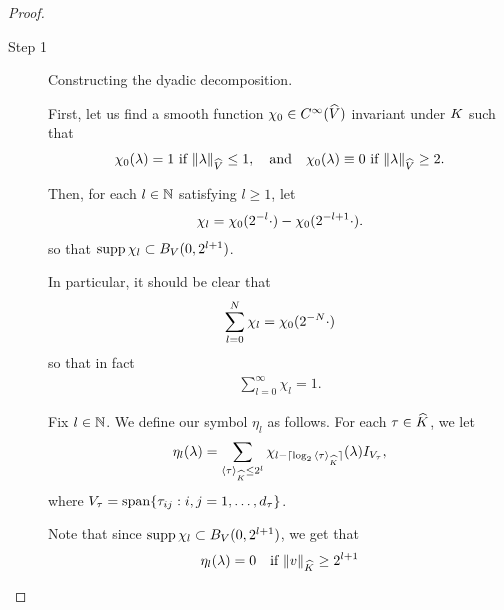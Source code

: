\begin{proof}
    \begin{description}
        \item[Step 1] Constructing the dyadic decomposition.

            First, let us find a smooth function $\chi_0 \in {C^\infty({\widehat{V}})}$ invariant under $K$ such that
            \begin{align*}
                \chi_0(\lambda) = 1 \  \text{if}\  \norm[\dualGroup{\VectorSpace}]{\lambda} \leq 1, \quad \text{and} \quad
                \chi_0(\lambda) \equiv 0 \ \text{if}\  \norm[\dualGroup{\VectorSpace}]{\lambda} \geq 2.
            \end{align*}

            Then, for each $l \in \mathbb{N}$ satisfying $l \geq 1$, let
            \begin{align*}
                \chi_l = \chi_0(2^{-l} \cdot) - \chi_0(2^{-l + 1} \cdot).
            \end{align*}
            so that $\operatorname{supp} \chi_l \subset {B_{V} (0, 2^{l + 1})}$.

            In particular, it should be clear that
            \begin{align*}
                \sum_{l = 0}^N \chi_l = \chi_0(2^{-N} \cdot)
            \end{align*}
            so that in fact
            \begin{align}
                \sum_{l = 0}^\infty \chi_l = 1.
                \label{eq:theorem:Littlewood-Paley_decomposition:partition_of_unity}
            \end{align}

            Fix $l \in \mathbb{N}$.
            We define our symbol $\eta_l$ as follows.
            For each $\tau \in {\widehat{K}}$, we let
            \begin{align*}
                \eta_l(\lambda)
                = \sum_{{\langle \tau \rangle}_{{\widehat{K}}} \leq 2^l}
                \chi_{l - \lceil\log_2 {\langle \tau \rangle}_{{\widehat{K}}}\rceil}(\lambda) {I_{V_\tau}},
            \end{align*}
            where $V_\tau = \operatorname{span} \{ \tau_{ij} : i, j = 1, \dots, {d_{\tau}} \}$.

            Note that since $\operatorname{supp} \chi_l \subset {B_{V} (0, 2^{l + 1})}$,
            we get that
            \begin{align}
                \eta_l(\lambda) = 0 \quad \text{if } \norm[\dualGroup{\CompactGroup}]{v} \geq 2^{l + 1}
                \label{eq:theorem:Littlewood-Paley_decomposition:cancellation_condition}
            \end{align}


\end{description}
\end{proof}

